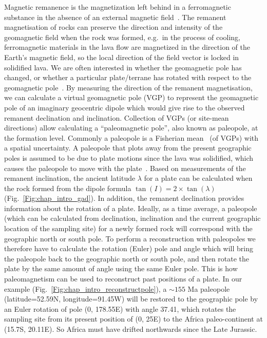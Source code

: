 Magnetic remanence is the magnetization left behind in a ferromagnetic substance
in the absence of an external magnetic field~\citep{T20}. The remanent
magnetisation of rocks can preserve the direction and intensity of the
geomagnetic field when the rock was formed, e.g.\ in the process of cooling,
ferromagnetic materials in the lava flow are magnetized in the direction of the
Earth's magnetic field, so the local direction of the field vector is locked in
solidified lava. We are often interested in whether the geomagnetic pole has
changed, or whether a particular plate/terrane has rotated with respect to the
geomagnetic pole~\citep{T20}. By measuring the direction of the remanent
magnetisation, we can calculate a virtual geomagnetic pole (VGP) to represent
the geomagnetic pole of an imaginary geocentric dipole which would give rise to
the observed remanent declination and inclination. Collection of VGPs (or
site-mean directions) allow calculating a ``paleomagnetic pole'', also known as
paleopole, at the formation level. Commonly a paleopole is a Fisherian
mean~\citep{F53} (of VGPs) with a spatial uncertainty. A paleopole that plots
away from the present geographic poles is assumed to be due to plate motions
since the lava was solidified, which causes the paleopole to move with the
plate~\citep{T08}. Based on measurements of the remanent inclination, the
ancient latitude $\lambda$ for a plate can be calculated when the rock formed
from the dipole formula $\tan(I) = 2 \times\tan(\lambda)$
(Fig.~\ref{Fig:chap_intro_gad}). In addition, the remanent declination provides
information about the rotation of a plate. Ideally, as a time average, a
paleopole (which can be calculated from declination, inclination and the current
geographic location of the sampling site) for a newly formed rock will
correspond with the geographic north or south pole. To perform a reconstruction
with paleopoles we therefore have to calculate the rotation (Euler) pole and
angle which will bring the paleopole back to the geographic north or south pole,
and then rotate the plate by the same amount of angle using the same Euler pole.
This is how paleomagnetism can be used to reconstruct past positions of a plate.
In our example (Fig.~\ref{Fig:chap_intro_reconstructpole}), a ${\sim}155$ Ma
paleopole (latitude=52.59\degree{}N, longitude=91.45\degree{}W) will be restored
to the geographic pole by an Euler rotation of pole (0\degree, 178.55\degree{}E)
with angle 37.41\degree, which rotates the sampling site from its present
position of (0\degree, 25\degree{}E) to the Africa paleo-continent at
(15.7\degree{}S, 20.11\degree{}E). So Africa must have drifted northwards since
the Late Jurassic.

